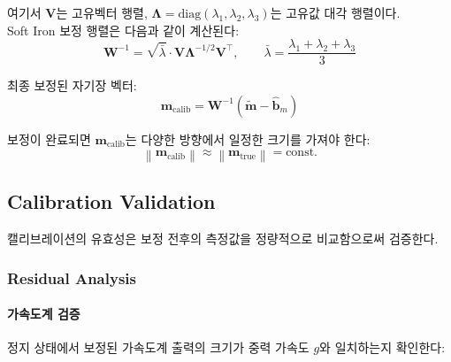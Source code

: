                 \noindent 여기서 $\mathbf{V}$는 고유벡터 행렬, $\boldsymbol{\Lambda} = \text{diag}(\lambda_1, \lambda_2, \lambda_3)$는 고유값 대각 행렬이다.\\

                Soft Iron 보정 행렬은 다음과 같이 계산된다:\\

                \begin{equation}
                    \mathbf{W}^{-1} = \sqrt{\bar{\lambda}} \cdot \mathbf{V} \boldsymbol{\Lambda}^{-1/2} \mathbf{V}^\top, \qquad \bar{\lambda} = \frac{\lambda_1 + \lambda_2 + \lambda_3}{3}
                    \label{eq:soft_iron_matrix}
                \end{equation}

                최종 보정된 자기장 벡터:\\

                \begin{equation}
                    \mathbf{m}_{\text{calib}} = \mathbf{W}^{-1} \left( \tilde{\mathbf{m}} - \hat{\mathbf{b}}_m \right)
                    \label{eq:mag_full_calib}
                \end{equation}

                보정이 완료되면 $\mathbf{m}_{\text{calib}}$는 다양한 방향에서 일정한 크기를 가져야 한다:\\

                \begin{equation}
                    \left\| \mathbf{m}_{\text{calib}} \right\| \approx \left\| \mathbf{m}_{\text{true}} \right\| = \text{const.}
                    \label{eq:mag_calib_check}
                \end{equation}

    \subsection{Calibration Validation}
        캘리브레이션의 유효성은 보정 전후의 측정값을 정량적으로 비교함으로써 검증한다.\\
        
        \subsubsection{Residual Analysis}
            \paragraph{가속도계 검증}
                정지 상태에서 보정된 가속도계 출력의 크기가 중력 가속도 $g$와 일치하는지 확인한다:\\

